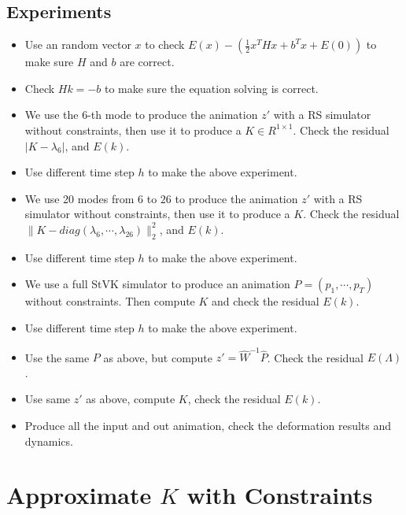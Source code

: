 \documentclass[twocolumn,a4paper]{article}
\begin{document}
\subsection{Experiments}
\begin{itemize}
\item Use an random vector $x$ to check $E(x)-(\frac{1}{2}x^THx+b^Tx+E(0))$ to
  make sure $H$ and $b$ are correct.
\item Check $Hk = -b$ to make sure the equation solving is correct.
\item We use the 6-th mode to produce the animation $z'$ with a RS simulator
  without constraints, then use it to produce a $K\in R^{1\times1}$. Check the
  residual $|K-\lambda_6|$, and $E(k)$.
\item Use different time step $h$ to make the above experiment.
\item We use 20 modes from $6$ to $26$ to produce the animation $z'$ with a RS
  simulator without constraints, then use it to produce a $K$. Check the
  residual $\|K-diag(\lambda_6,\cdots,\lambda_{26})\|_2^2$, and $E(k)$.
\item Use different time step $h$ to make the above experiment.
\item We use a full StVK simulator to produce an animation $P =
  (p_1,\cdots,p_T)$ without constraints. Then compute $K$ and check the residual
  $E(k)$.
\item Use different time step $h$ to make the above experiment.
\item Use the same $P$ as above, but compute $z' = \hat{W}^{-1}\hat{P}$. Check
  the residual $E(\Lambda)$.
\item Use same $z'$ as above, compute $K$, check the residual $E(k)$.
\item Produce all the input and out animation, check the deformation results and
  dynamics.
\end{itemize}

\section{Approximate $K$ with Constraints}





\end{document}
